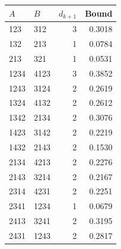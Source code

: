 \begin{tabular}{@{}llrr@{}}
\toprule
$A$&$B$&$d_{k+1}$&Bound\\
\midrule
123&312&3&0.3018\\
132&213&1&0.0784\\
213&321&1&0.0531\\
1234&4123&3&0.3852\\
1243&3124&2&0.2619\\
1324&4132&2&0.2612\\
1342&2134&2&0.3076\\
1423&3142&2&0.2219\\
1432&2143&2&0.1530\\
2134&4213&2&0.2276\\
2143&3214&2&0.2167\\
2314&4231&2&0.2251\\
2341&1234&1&0.0679\\
2413&3241&2&0.3195\\
2431&1243&2&0.2817\\
\bottomrule
\end{tabular}
